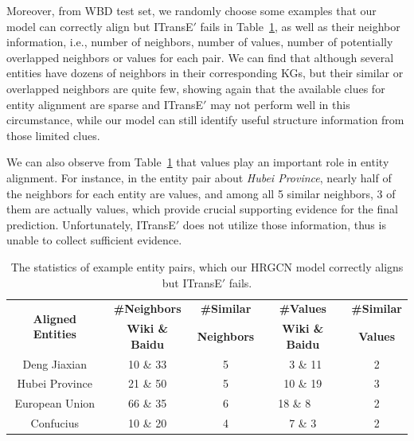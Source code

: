 Moreover, from WBD test set, we randomly choose some examples that our \HRGCN model can correctly align but ITransE$'$ fails in Table~\ref{example}, as well as their neighbor information, i.e., number of neighbors, number of values, number of potentially overlapped neighbors or values for each pair.
We can find that although several entities have dozens of neighbors in their corresponding KGs, but their similar or overlapped neighbors are quite few, showing again that
the available clues for entity alignment are sparse and ITransE$'$ may not perform well in this circumstance, while our \HRGCN model can still identify useful structure information from those limited clues.

We can also observe from Table~\ref{example} that values play an important role in entity alignment.
For instance, in the entity pair about \textit{Hubei Province}, nearly half of the neighbors for each entity are values, and among all 5 similar neighbors, 3 of them are actually values,
which provide crucial supporting evidence for the final prediction. Unfortunately, ITransE$'$ does not utilize those information, thus is unable to collect sufficient evidence.

\begin{table}
	\centering
	\scriptsize
	\begin{tabular}{ccccc}
		\toprule
		\multirow{2}{*}{\bf Aligned Entities} & \bf \#Neighbors & \bf \#Similar & \bf \#Values & \bf \#Similar \\
		&\bf  Wiki \& Baidu &\bf  Neighbors &\bf  Wiki \& Baidu &\bf  Values \\
		\midrule
		Deng Jiaxian & 10 \& 33 & 5 & \ 3 \& 11 & 2\\
		Hubei Province & 21 \& 50 & 5 & 10 \& 19 & 3\\
		European Union & 66 \& 35 & 6 & 18 \& 8\ \ \ & 2\\
		Confucius & 10 \& 20 & 4 & 7 \& 3 & 2\\
		\bottomrule
	\end{tabular}
	\caption{The statistics of example entity pairs, which our HRGCN model correctly aligns but ITransE$'$ fails.}
	\label{example}
\end{table}


